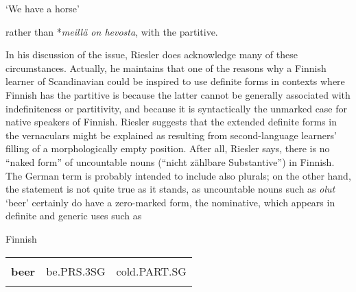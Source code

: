 \begin{styleTranslation}
‘We have a horse’

\end{styleTranslation}

\begin{styleBodyTextFirst}
rather than *\textit{meillä on hevosta}, with the partitive.

\end{styleBodyTextFirst}

\begin{styleBodytextC}
In his discussion of the issue, Riesler does acknowledge many of these circumstances. Actually, he maintains that one of the reasons why a Finnish learner of Scandinavian could be inspired to use definite forms in contexts where Finnish has the partitive is because the latter cannot be generally associated with indefiniteness or partitivity, and because it is syntactically the unmarked case for native speakers of Finnish. Riesler suggests that the extended definite forms in the vernaculars might be explained as resulting from second-language learners’ filling of a morphologically empty position. After all, Riesler says, there is no “naked form” of uncountable nouns (“nicht zählbare Substantive”) in Finnish. The German term is probably intended to include also plurals; on the other hand, the statement is not quite true as it stands, as uncountable nouns such as \textit{olut} ‘beer’ certainly do have a zero-marked form, the nominative, which appears in definite and generic uses such as

\end{styleBodytextC}

\begin{listWWNumileveli}
\item {}

\begin{styleExample}
Finnish

\end{styleExample}

\end{listWWNumileveli}

\begin{listWWNumlivleveli}
\item {}

\end{listWWNumlivleveli}

\begin{tabular}{lll}
\lsptoprule
\multicolumn{3}{l}{Olut

}\\
{\bfseries beer} & be.PRS.3SG & cold.PART.SG\\
\lspbottomrule
\end{tabular}

